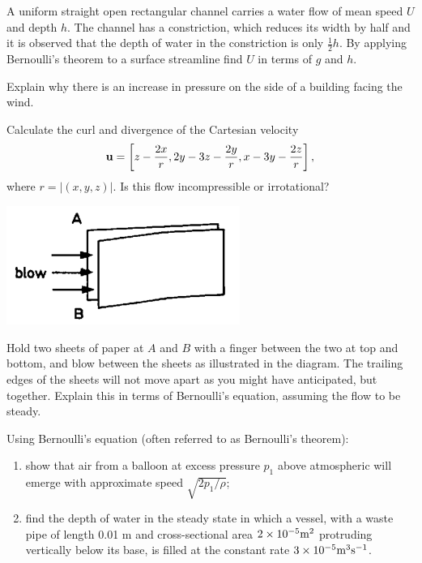 \documentclass[10pt]{report}
\begin{document}
\begin{questionstar}
	A uniform straight open rectangular channel carries a water flow of mean
	speed $U$ and depth $h$. The channel has a constriction, which reduces its width
	by half and it is observed that the depth of water in the constriction is
	only $\textstyle{\frac12}h$. By applying Bernoulli's theorem to a surface
	streamline find $U$ in terms of $g$ and $h$.
	\label{qn:bernoullichannel}
\end{questionstar}

\begin{questionstar}
	Explain why there is an increase in pressure on the side of a building
	facing the wind.
	\label{qn:buildingpressure}
\end{questionstar}

\begin{question}
	Calculate the curl and divergence of the Cartesian velocity
	\[
	{{\bf u}}=\left[ {z-\frac{2x}{r},2y-3z-\frac{2y}{r},x-3y-\frac{2z}{r}}
	\right],
	\]
	where $r = |(x,y,z)|$. Is  this flow incompressible or irrotational?
	\label{qn:curldivergence}
\end{question}


\begin{question}
	{\includegraphics[width=3in]{Section34.pdf}}

	Hold two sheets of paper at $A$ and $B$ with a finger between the two at top
	and bottom, and blow between the sheets as illustrated in the diagram.
	The trailing edges of the sheets will not move apart as you might have anticipated, but
	together. Explain this in terms of Bernoulli's equation, assuming the flow
	to be steady.
	\label{qn:blow}
\end{question}

\begin{questionstar}
	Using Bernoulli's equation (often referred to as Bernoulli's theorem):
	\begin{enumerate}
		\item show that air from a balloon at excess pressure $p_{1}$ above
		atmospheric will emerge with approximate speed $\sqrt {2p_1 /\rho } $;
		\item find the depth of water in the steady state in which a vessel, with a
		waste pipe of length 0.01 m and cross-sectional area $2\times
		10^{-5}\hbox{m}^2$ protruding vertically below its base, is filled at the
		constant rate $3\times 10^{-5}\hbox{m}^3\hbox{s}^{-1}$.
	\end{enumerate}
	\label{qn:balloon}
\end{questionstar}
\end{document}
